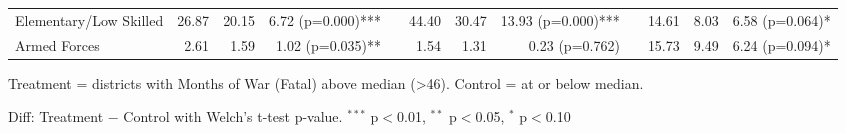 \begin{table}[htbp]
\begin{tabular}{l rrr c rrr c rrr}
\quad Elementary/Low Skilled & 26.87 & 20.15 & 6.72 (p=0.000)*** &  & 44.40 & 30.47 & 13.93 (p=0.000)*** &  & 14.61 & 8.03 & 6.58 (p=0.064)* \\
\quad Armed Forces & 2.61 & 1.59 & 1.02 (p=0.035)** &  & 1.54 & 1.31 & 0.23 (p=0.762) &  & 15.73 & 9.49 & 6.24 (p=0.094)* \\
\bottomrule
\end{tabular}
\begin{tablenotes}
\small
\item Treatment = districts with Months of War (Fatal) above median (>46). Control = at or below median.
\item Diff: Treatment $-$ Control with Welch's t-test p-value. $^{{***}}$ p$<$0.01, $^{{**}}$ p$<$0.05, $^{{*}}$ p$<$0.10
\end{tablenotes}
\end{table}

\clearpage

